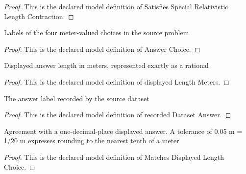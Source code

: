 \begin{proof}
  This is the declared model definition of Satisfies Special Relativistic Length Contraction.
\end{proof}
\begin{definition}
  \label{def:physics:phyx-mini-0509:phyxminiproblems-problemphyxmini0509-answerchoice}
  Labels of the four meter-valued choices in the source problem
\end{definition}
\begin{proof}
  This is the declared model definition of Answer Choice.
\end{proof}
\begin{definition}
  \label{def:physics:phyx-mini-0509:phyxminiproblems-problemphyxmini0509-displayedlengthmeters}
  Displayed answer length in meters, represented exactly as a rational
\end{definition}
\begin{proof}
  This is the declared model definition of displayed Length Meters.
\end{proof}
\begin{definition}
  \label{def:physics:phyx-mini-0509:phyxminiproblems-problemphyxmini0509-recordeddatasetanswer}
  The answer label recorded by the source dataset
\end{definition}
\begin{proof}
  This is the declared model definition of recorded Dataset Answer.
\end{proof}
\begin{definition}
  \label{def:physics:phyx-mini-0509:phyxminiproblems-problemphyxmini0509-matchesdisplayedlengthchoice}
  Agreement with a one-decimal-place displayed answer. A tolerance of 0.05 m = 1/20 m expresses rounding to the nearest tenth of a meter
\end{definition}
\begin{proof}
  This is the declared model definition of Matches Displayed Length Choice.
\end{proof}
